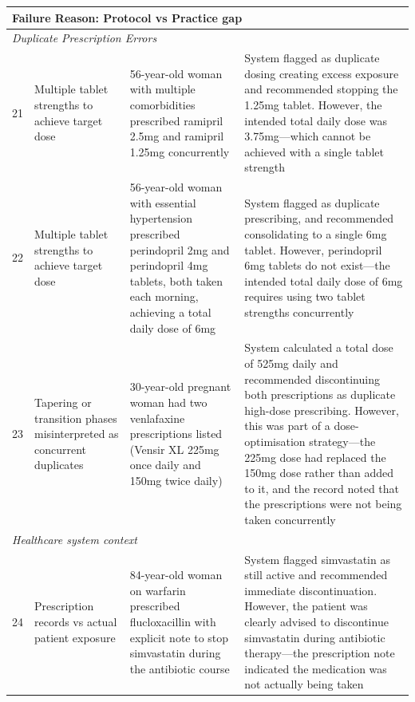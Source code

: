 {\begin{longtable}{p{}p{}p{}p{}}
                \midrule
                \multicolumn{4}{l}{\textbf{Failure Reason: Protocol vs Practice gap}} \\
                \midrule
                \multicolumn{4}{l}{\textit{Duplicate Prescription Errors}} \\
                \midrule
                \hypertarget{vignette-21}{21} & Multiple tablet strengths to achieve target dose & 56-year-old woman with multiple comorbidities prescribed ramipril 2.5mg and ramipril 1.25mg concurrently & System flagged as duplicate dosing creating excess exposure and recommended stopping the 1.25mg tablet. However, the intended total daily dose was 3.75mg—which cannot be achieved with a single tablet strength \\
                \midrule
                \hypertarget{vignette-22}{22} & Multiple tablet strengths to achieve target dose & 56-year-old woman with essential hypertension prescribed perindopril 2mg and perindopril 4mg tablets, both taken each morning, achieving a total daily dose of 6mg & System flagged as duplicate prescribing, and recommended consolidating to a single 6mg tablet. However, perindopril 6mg tablets do not exist—the intended total daily dose of 6mg requires using two tablet strengths concurrently \\
                \midrule
                \hypertarget{vignette-23}{23} & Tapering or transition phases misinterpreted as concurrent duplicates & 30-year-old pregnant woman had two venlafaxine prescriptions listed (Vensir XL 225mg once daily and 150mg twice daily) & System calculated a total dose of 525mg daily and recommended discontinuing both prescriptions as duplicate high-dose prescribing. However, this was part of a dose-optimisation strategy—the 225mg dose had replaced the 150mg dose rather than added to it, and the record noted that the prescriptions were not being taken concurrently \\
                \midrule
                \multicolumn{4}{l}{\textit{Healthcare system context}} \\
                \midrule
                \hypertarget{vignette-24}{24} & Prescription records vs actual patient exposure & 84-year-old woman on warfarin prescribed flucloxacillin with explicit note to stop simvastatin during the antibiotic course & System flagged simvastatin as still active and recommended immediate discontinuation. However, the patient was clearly advised to discontinue simvastatin during antibiotic therapy—the prescription note indicated the medication was not actually being taken \\

\end{longtable}}
